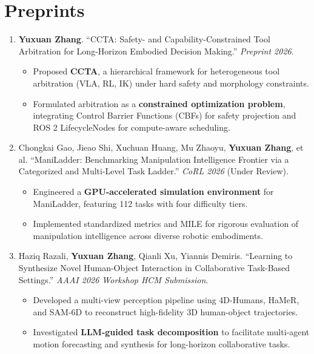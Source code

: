 \documentclass[11pt]{article}
\newenvironment{cvitems}{%
  \setlength{\parskip}{0pt}%
\begin{itemize}[leftmargin=*, itemsep=0.1em, topsep=0em, partopsep=0em, parsep=0pt]}{
  \end{itemize}}
\begin{document}
\section{Preprints}
\begin{enumerate}[leftmargin=*, itemsep=0.25em, topsep=0.2em]
  \item \textbf{Yuxuan Zhang}. ``CCTA: Safety- and Capability-Constrained Tool Arbitration for Long-Horizon Embodied Decision Making.'' \textit{Preprint 2026}.
    \begin{cvitems}
    \item Proposed \textbf{CCTA}, a hierarchical framework for heterogeneous tool arbitration (VLA, RL, IK) under hard safety and morphology constraints.
    \item Formulated arbitration as a \textbf{constrained optimization problem}, integrating Control Barrier Functions (CBFs) for safety projection and ROS 2 LifecycleNodes for compute-aware scheduling.
    \end{cvitems}
  \item Chongkai Gao, Jieao Shi, Xuchuan Huang, Mu Zhaoyu, \textbf{Yuxuan Zhang}, et al. ``ManiLadder: Benchmarking Manipulation Intelligence Frontier via a Categorized and Multi-Level Task Ladder.'' \textit{CoRL 2026} (Under Review).
    \begin{cvitems}
    \item Engineered a \textbf{GPU-accelerated simulation environment} for ManiLadder, featuring 112 tasks with four difficulty tiers.
    \item Implemented standardized metrics and MILE for rigorous evaluation of manipulation intelligence across diverse robotic embodiments.
    \end{cvitems}
  \item Haziq Razali, \textbf{Yuxuan Zhang}, Qianli Xu, Yiannis Demiris. ``Learning to Synthesize Novel Human-Object Interaction in Collaborative Task-Based Settings.'' \textit{AAAI 2026 Workshop HCM Submission}.
    \begin{cvitems}
    \item Developed a multi-view perception pipeline using 4D-Humans, HaMeR, and SAM-6D to reconstruct high-fidelity 3D human-object trajectories.
    \item Investigated \textbf{LLM-guided task decomposition} to facilitate multi-agent motion forecasting and synthesis for long-horizon collaborative tasks.
    \end{cvitems}
\end{enumerate}
\end{document}
